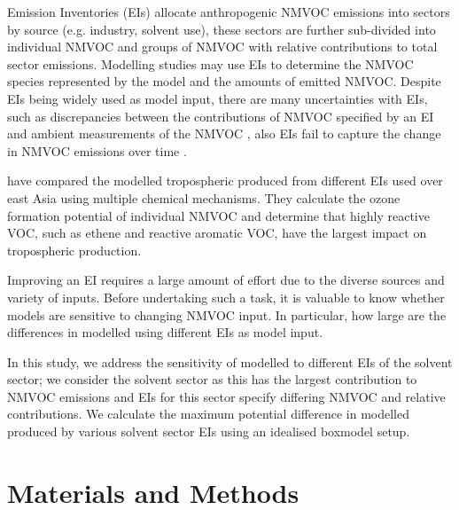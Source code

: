 \documentclass[14pt]{extarticle}
\begin{document}
Emission Inventories (EIs) allocate anthropogenic NMVOC emissions into sectors by source (e.g. industry, solvent use), these sectors are further sub-divided into individual NMVOC and groups of NMVOC with relative contributions to total sector emissions. 
Modelling studies may use EIs to determine the NMVOC species represented by the model and the amounts of emitted NMVOC.  
Despite EIs being widely used as model input, there are many uncertainties with EIs, such as discrepancies between the contributions of NMVOC specified by an EI and ambient measurements of the NMVOC \citep{Borbon:2013}, also EIs fail to capture the change in NMVOC emissions over time \citep{Boynard:2014}.

\citet{Li:2014} have compared the modelled tropospheric  produced from different EIs used over east Asia using multiple chemical mechanisms.
They calculate the ozone formation potential of individual NMVOC and determine that highly reactive VOC, such as ethene and reactive aromatic VOC, have the largest impact on tropospheric  production.

Improving an EI requires a large amount of effort due to the diverse sources and variety of inputs. 
Before undertaking such a task, it is valuable to know whether models are sensitive to changing NMVOC input.
In particular, how large are the differences in modelled  using different EIs as model input.

In this study, we address the sensitivity of modelled  to different EIs of the solvent sector; we consider the solvent sector as this has the largest contribution to NMVOC emissions \citep{AQEU:2011} and EIs for this sector specify differing NMVOC and relative contributions.
We calculate the maximum potential difference in modelled  produced by various solvent sector EIs using an idealised boxmodel setup.

\section{Materials and Methods}
\end{document}
